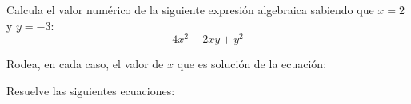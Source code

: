\documentclass[addpoints,spanish, 12pt,a4paper]{exam}
\begin{document}
\begin{questions}
\begin{multicols}{2}
\end{multicols}

\question[1]
Calcula el valor numérico de la siguiente expresión algebraica sabiendo que \( x = 2 \) y \( y = -3 \):
\[
4x^2 - 2xy + y^2
\]
\vspace{30pt}

\question
Rodea, en cada caso, el valor de \( x \) que es solución de la ecuación:

\question
Resuelve las siguientes ecuaciones:
\end{questions}
\end{document}

